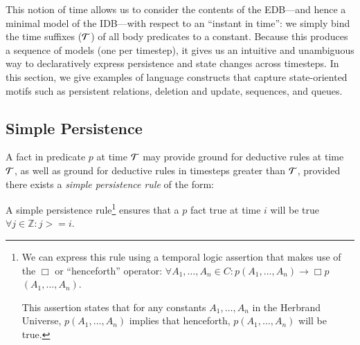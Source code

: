 This notion of time allows us to consider the contents of the EDB---and hence
a minimal model of the IDB---with respect to an ``instant in time'': we simply
bind the time suffixes ($\Tau$) of all body predicates to a constant.  Because
this produces a sequence of models (one per timestep), it gives us an intuitive
and unambiguous way to declaratively express persistence and state changes
across timesteps.  In this section, we give examples of language constructs
that capture state-oriented motifs such as persistent relations,
deletion and update, sequences, and queues.

\subsection{Simple Persistence}

A fact in predicate $p$ at time $\Tau$ may provide ground for deductive rules
at time $\Tau$, as well as ground for deductive rules in timesteps greater than $\Tau$,
provided there exists a {\em simple persistence rule} of the form:


\noindent
A simple persistence rule\footnote{We can
express this rule using a temporal logic assertion that makes use of the $\Box$
or ``henceforth'' operator:
$\forall A_1, \ldots, A_n \in C : p$\pos$(A_1, \ldots, A_n) \to \Box p$\pos$(A_1,
\ldots, A_n)$.

This assertion states that for any constants $A_1, \ldots, A_n$ in the Herbrand
Universe, $p$\pos$(A_1, \ldots, A_n)$ implies that henceforth, \linebreak
$p$\pos$(A_1, \ldots, A_n)$ will be true.}
%
 ensures that a $p$ fact true at time $i$ will be true $\forall j \in \mathbb{Z} : j >= i$.


